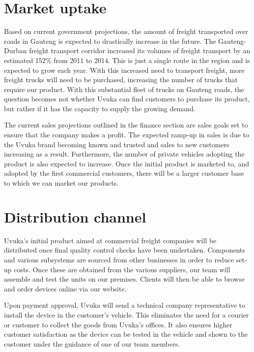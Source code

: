 \section{Market uptake}

Based on current government projections, the amount of freight transported over roads in Gauteng is expected to drastically increase in the future. The Gauteng-Durban freight transport corridor increased its volumes of freight transport by an estimated 152\% from 2011 to 2014\cite{freighttransport}. This is just a single route in the region and is expected to grow each year. With this increased need to transport freight, more freight trucks will need to be purchased, increasing the number of trucks that require our product. With this substantial fleet of trucks on Gauteng roads, the question becomes not whether Uvuka can find customers to purchase its product, but rather if it has the capacity to supply the growing demand.

The current sales projections outlined in the finance section are sales goals set to ensure that the company makes a profit. The expected ramp-up in sales is due to the Uvuka brand becoming known and trusted and sales to new customers increasing as a result. Furthermore, the number of private vehicles adopting the product is also expected to increase. Once the initial product is marketed to, and adopted by the first commercial customers, there will be a larger customer base to which we can market our products.

\section{Distribution channel}
Uvuka's initial product aimed at commercial freight companies will be distributed once final quality control checks have been undertaken. Components and various subsystems are sourced from other businesses in order to reduce set-up costs. Once these are obtained from the various suppliers, our team will assemble and test the units on our premises. Clients will then be able to browse and order devices online via our website.

Upon payment approval, Uvuka will send a technical company representative to install the device in the customer's vehicle. This eliminates the need for a courier or customer to collect the goods from Uvuka's offices. It also ensures higher customer satisfaction as the device can be tested in the vehicle and shown to the customer under the guidance of one of our team members.

